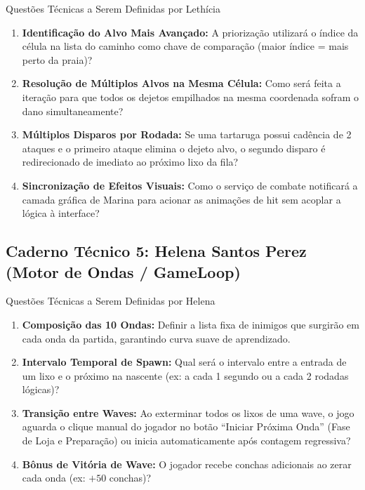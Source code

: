 \documentclass[11pt,a4paper]{article}
\begin{document}
\begin{perguntaBox}{Questões Técnicas a Serem Definidas por Lethícia}
\begin{enumerate}
  \item \textbf{Identificação do Alvo Mais Avançado:} A priorização utilizará o índice da célula na lista do caminho como chave de comparação (maior índice = mais perto da praia)?
  \item \textbf{Resolução de Múltiplos Alvos na Mesma Célula:} Como será feita a iteração para que todos os dejetos empilhados na mesma coordenada sofram o dano simultaneamente?
  \item \textbf{Múltiplos Disparos por Rodada:} Se uma tartaruga possui cadência de 2 ataques e o primeiro ataque elimina o dejeto alvo, o segundo disparo é redirecionado de imediato ao próximo lixo da fila?
  \item \textbf{Sincronização de Efeitos Visuais:} Como o serviço de combate notificará a camada gráfica de Marina para acionar as animações de hit sem acoplar a lógica à interface?
\end{enumerate}
\end{perguntaBox}

\subsection{Caderno Técnico 5: Helena Santos Perez (Motor de Ondas / GameLoop)}

\begin{perguntaBox}{Questões Técnicas a Serem Definidas por Helena}
\begin{enumerate}
  \item \textbf{Composição das 10 Ondas:} Definir a lista fixa de inimigos que surgirão em cada onda da partida, garantindo curva suave de aprendizado.
  \item \textbf{Intervalo Temporal de Spawn:} Qual será o intervalo entre a entrada de um lixo e o próximo na nascente (ex: a cada 1 segundo ou a cada 2 rodadas lógicas)?
  \item \textbf{Transição entre Waves:} Ao exterminar todos os lixos de uma wave, o jogo aguarda o clique manual do jogador no botão ``Iniciar Próxima Onda'' (Fase de Loja e Preparação) ou inicia automaticamente após contagem regressiva?
  \item \textbf{Bônus de Vitória de Wave:} O jogador recebe conchas adicionais ao zerar cada onda (ex: $+50$ conchas)?
\end{enumerate}
\end{perguntaBox}
\end{document}

